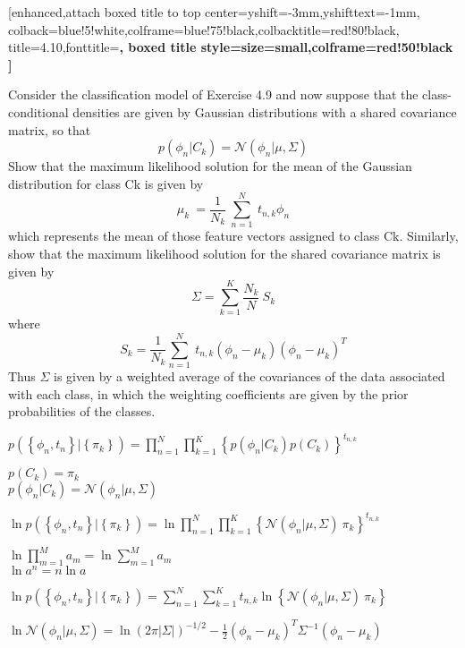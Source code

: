 \documentclass{article}
\begin{document}
\begin {tcolorbox}
    [enhanced,attach boxed title to top center={yshift=-3mm,yshifttext=-1mm}, colback=blue!5!white,colframe=blue!75!black,colbacktitle=red!80!black, title=4.10,fonttitle=\bfseries, boxed title style={size=small,colframe=red!50!black} ]
  
Consider the classification model of Exercise 4.9 and now suppose that the class-conditional densities are given by Gaussian distributions with a shared covariance matrix, so that 
        $$ p\left(\phi_n|C_k\right)=\mathcal{N}\left(\phi_n|\mu,\Sigma\right) $$
Show that the maximum likelihood solution for the mean of the Gaussian distribution for class Ck is given by
        $$ \mu_k\ =\frac{1}{N_k}\ \sum_{n=1}^{N}{\ t_{n,k}\phi_n} $$
which represents the mean of those feature vectors assigned to class Ck. Similarly, show that the maximum likelihood solution for the shared covariance matrix is given by
        $$ \Sigma=\sum_{k=1}^{K}{\frac{N_k}{N}\ S_k} $$
where
        $$ S_k=\frac{1}{N_k}\sum_{n=1}^{N}{\ t_{n,k}\left(\phi_n-\mu_k\right)\left(\phi_n-\mu_k\right)^T} $$
Thus $\Sigma$ is given by a weighted average of the covariances of the data associated with each class, in which the weighting coefficients are given by the prior probabilities of the classes.
\end{tcolorbox}

$ \displaystyle
   p\left(\left\{\phi_n ,t_n\right\}|\left\{\pi_k\right\}\right)=
   \prod_{n=1}^{N}{
        \prod_{k=1}^{K}{
            \left\{p\left(\phi_n|C_k\right) p\left(C_k\right)\right\}^{t_{n,k}} 
        }
    }
$
\begin{center}
    $ \displaystyle p\left(C_k\right)=\pi_k $ \\
    $ \displaystyle p\left(\phi_n|C_k\right)=\mathcal{N}\left(\phi_n|\mu,\Sigma\right) $
\end{center}

$ \displaystyle
    \ln{p\left(\left\{\phi_n,t_n\right\}|\left\{\pi_k\right\}\right)}=\ln{
        \prod_{n=1}^{N}{
            \prod_{k=1}^{K}{
                \left\{\mathcal{N}\left(\phi_n|\mu,\Sigma\right)\ \pi_k\right\}^{t_{n,k}}
                }\
            }
        }
$
\begin{center}
    $ \displaystyle \ln{\prod_{m=1}^{M}a_m}=\ln{\sum_{m=1}^{M}a_m} $ \\
    $ \displaystyle \ln{a^n}=n\ln{a} $
\end{center}

$ \displaystyle
    \ln{
        p\left(\left\{\phi_n,t_n\right\}|\left\{\pi_k\right\}\right)
    }=
    \sum_{n=1}^{N}{
        \sum_{k=1}^{K}{t_{n,k}{
            \ln{
                \left\{\mathcal{N}\left(\phi_n|\mu,\Sigma\right)\ \pi_k\right\}}
            }
        }
    }
$
\begin{center}
    $\displaystyle \ln{\mathcal{N}\left(\phi_n|\mu,\Sigma\right)}=\ln{\left(2\pi\left|\Sigma\right|\right)^{-1/2}}-\frac{1}{2}\left(\phi_n-\mu_k\right)^T\Sigma^{-1}\left(\phi_n-\mu_k\right) $
\end{center}
\end{document}
